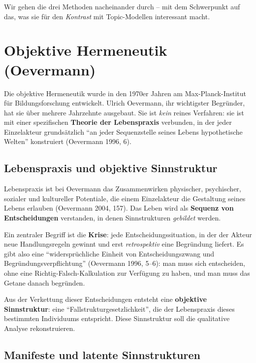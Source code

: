 \documentclass[a4paper,11pt]{article}
\begin{document}
Wir gehen die drei Methoden nacheinander durch -- mit dem Schwerpunkt
auf das, was sie für den \emph{Kontrast} mit Topic-Modellen
interessant macht.

\section{Objektive Hermeneutik (Oevermann)}

Die objektive Hermeneutik wurde in den 1970er Jahren am Max-Planck-Institut
für Bildungsforschung entwickelt. Ulrich Oevermann, ihr wichtigster
Begründer, hat sie über mehrere Jahrzehnte ausgebaut. Sie ist
\emph{kein} reines Verfahren: sie ist mit einer spezifischen
\textbf{Theorie der Lebenspraxis} verbunden, in der jeder
Einzelakteur grundsätzlich \enquote{an jeder Sequenzstelle seines
Lebens hypothetische Welten} konstruiert (Oevermann 1996, 6).

\subsection{Lebenspraxis und objektive Sinnstruktur}

Lebenspraxis ist bei Oevermann das Zusammenwirken physischer,
psychischer, sozialer und kultureller Potentiale, die einem
Einzelakteur die Gestaltung seines Lebens erlauben (Oevermann 2004,
157). Das Leben wird als \textbf{Sequenz von Entscheidungen}
verstanden, in denen Sinnstrukturen \emph{gebildet} werden.

Ein zentraler Begriff ist die \textbf{Krise}: jede
Entscheidungssituation, in der der Akteur neue Handlungsregeln
gewinnt und erst \emph{retrospektiv} eine Begründung liefert. Es
gibt also eine \enquote{widersprüchliche Einheit von
Entscheidungszwang und Begründungsverpflichtung} (Oevermann
1996, 5--6): man muss sich entscheiden, ohne eine
Richtig-Falsch-Kalkulation zur Verfügung zu haben, und man muss
das Getane danach begründen.

Aus der Verkettung dieser Entscheidungen entsteht eine
\textbf{objektive Sinnstruktur}: eine \enquote{Fallstrukturgesetzlichkeit},
die der Lebenspraxis dieses bestimmten Individuums entspricht. Diese
Sinnstruktur soll die qualitative Analyse rekonstruieren.

\subsection{Manifeste und latente Sinnstrukturen}
\end{document}
